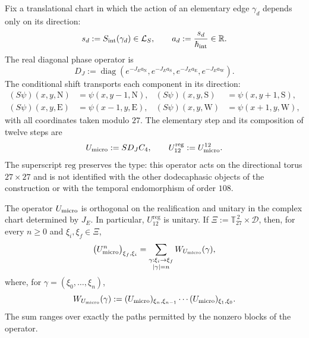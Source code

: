 Fix a translational chart in which the action of an elementary edge
\(\gamma_d\) depends only on its direction:
\[
 s_d:=S_{\rm int}(\gamma_d)\in\mathcal L_S,
 \qquad
 a_d:=\frac{s_d}{\hbar_{\rm int}}\in\mathbb R.
\]
The real diagonal phase operator is
\[
 D_J:=\operatorname{diag}
 \left(
  e^{-J_Ea_{\mathrm N}},
  e^{-J_Ea_{\mathrm S}},
  e^{-J_Ea_{\mathrm E}},
  e^{-J_Ea_{\mathrm W}}
 \right).
\]
The conditional shift transports each component in its direction:
\begin{align*}
 (S\psi)(x,y,\mathrm N)&=\psi(x,y-1,\mathrm N),&
 (S\psi)(x,y,\mathrm S)&=\psi(x,y+1,\mathrm S),\\
 (S\psi)(x,y,\mathrm E)&=\psi(x-1,y,\mathrm E),&
 (S\psi)(x,y,\mathrm W)&=\psi(x+1,y,\mathrm W),
\end{align*}
with all coordinates taken modulo \(27\). The elementary step and its
composition of twelve steps are
\begin{equation}
 U_{\rm micro}:=S D_J C_4,
 \qquad
 U_{12}^{\mathrm{reg}}:=U_{\rm micro}^{12}.
 \label{eq:paso-unitario-registro-27-rev3}
\end{equation}
The superscript \(\mathrm{reg}\) preserves the type: this operator acts on
the directional torus \(27\times27\) and is not identified with the other
dodecaphasic objects of the construction or with the temporal endomorphism of order \(108\).

\begin{proposition}
\label{prop:unitariedad-suma-registro-27-rev3}
The operator \(U_{\rm micro}\) is orthogonal on the realification and unitary
in the complex chart determined by \(J_E\). In particular,
\(U_{12}^{\mathrm{reg}}\) is unitary. If
\(\Xi:=\mathbb T_{27}^{\,2}\times\mathcal D\), then, for every
\(n\geq0\) and \(\xi_i,\xi_f\in\Xi\),
\[
 \bigl(U_{\rm micro}^{n}\bigr)_{\xi_f,\xi_i}
 =
 \sum_{\substack{\gamma:\xi_i\to\xi_f\\|\gamma|=n}}
 W_{U_{\rm micro}}(\gamma),
\]
where, for \(\gamma=(\xi_0,\ldots,\xi_n)\),
\[
 W_{U_{\rm micro}}(\gamma)
 :=
 (U_{\rm micro})_{\xi_n,\xi_{n-1}}
 \cdots
 (U_{\rm micro})_{\xi_1,\xi_0}.
\]
The sum ranges over exactly the paths permitted by the nonzero blocks
of the operator.
\end{proposition}

